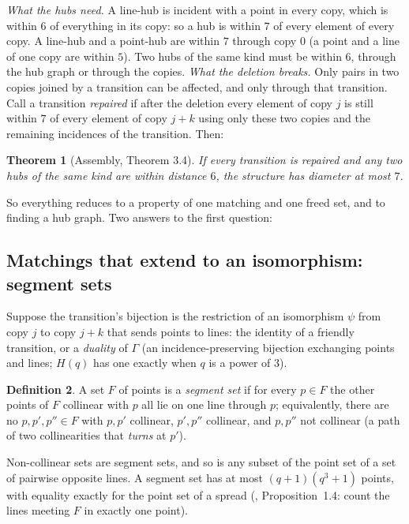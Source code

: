\documentclass[11pt]{amsart}
\newtheorem{theorem}{Theorem}[section]
\theoremstyle{definition}
\newtheorem{definition}[theorem]{Definition}
\theoremstyle{remark}
\begin{document}
\emph{What the hubs need.} A line-hub is incident with a point in every copy, which is within $6$ of everything in its copy: so a hub is within $7$ of every element of every copy. A line-hub and a point-hub are within $7$ through copy $0$ (a point and a line of one copy are within $5$). Two hubs of the same kind must be within $6$, through the hub graph or through the copies. \emph{What the deletion breaks.} Only pairs in two copies joined by a transition can be affected, and only through that transition. Call a transition \emph{repaired} if after the deletion every element of copy $j$ is still within $7$ of every element of copy $j+k$ using only these two copies and the remaining incidences of the transition. Then:

\begin{theorem}[Assembly,  Theorem 3.4]\label{thm:assembly}
If every transition is repaired and any two hubs of the same kind are within distance $6$, the structure has diameter at most $7$.
\end{theorem}

So everything reduces to a property of one matching and one freed set, and to finding a hub graph. Two answers to the first question:

\subsection{Matchings that extend to an isomorphism: segment sets}\label{ssec:segment}
Suppose the transition's bijection is the restriction of an isomorphism $\psi$ from copy $j$ to copy $j+k$ that sends points to lines: the identity of a friendly transition, or a \emph{duality} of $\Gamma$ (an incidence-preserving bijection exchanging points and lines; $H(q)$ has one exactly when $q$ is a power of $3$).

\begin{definition}\label{def:segment}
A set $F$ of points is a \emph{segment set} if for every $p\in F$ the other points of $F$ collinear with $p$ all lie on one line through $p$; equivalently, there are no $p,p',p''\in F$ with $p,p'$ collinear, $p',p''$ collinear, and $p,p''$ not collinear (a path of two collinearities that \emph{turns} at $p'$).
\end{definition}

Non-collinear sets are segment sets, and so is any subset of the point set of a set of pairwise opposite lines. A segment set has at most $(q+1)(q^3+1)$ points, with equality exactly for the point set of a spread (, Proposition~1.4: count the lines meeting $F$ in exactly one point).
\end{document}
